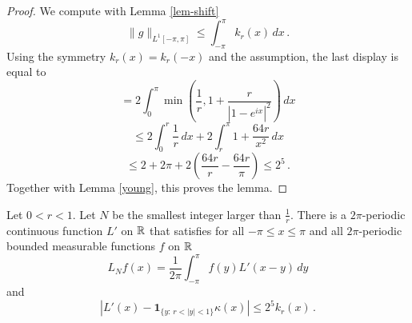 {\begin{lemma}
\end{lemma}

\begin{proof}
We compute with Lemma \ref{lem-shift}
\begin{equation}
    \|g\|_{L^1[-\pi, \pi]} \le  \int_{-\pi}^{\pi}k_r(x)\, dx\,.
\end{equation}
Using the symmetry
$k_r(x)=k_r(-x)$ and the assumption,  the last display
is equal to
\begin{equation*}
    =  2 \int_0^\pi \min\left(\frac 1r, 1+\frac r{|1-e^{ix}|^2}\right)\, dx
\end{equation*}
\begin{equation*}
    \le 2\int_0^{r} \frac 1r \, dx+2\int_r^{\pi}1+\frac {64r}{x^2}\, dx
\end{equation*}
\begin{equation}
    \le 2+2\pi + 2\left(\frac {64r}r-\frac {64r}{\pi}\right)
    \le 2^{5}\, .
\end{equation}
    Together with Lemma \ref{young}, this proves the lemma.
\end{proof}

\begin{lemma}\label{lem-dirichlet2}
Let $0<r<1$. Let $N$ be the smallest
integer larger than $\frac 1r$.
There is a   $2\pi$-periodic continuous function
 ${L'}$ on ${\mathbb{R}}$ that satisfies for all $-\pi\le x\le \pi$
and all $2\pi$-periodic bounded measurable functions $f$ on ${\mathbb{R}}$
\begin{equation}\label{lthroughlprime}
    L_Nf(x)=\frac 1{2\pi}\int_{-\pi}^{\pi}f(y) {L'}(x-y)\, dy
\end{equation}
and
\begin{equation}\label{eqdifflhil}
    \left|L'(x)-\mathbf{1}_{\{y:\, r<|y|<1\}} \kappa(x)\right|\le 2^{5}k_r(x)\, .
\end{equation}
\end{lemma}


}
